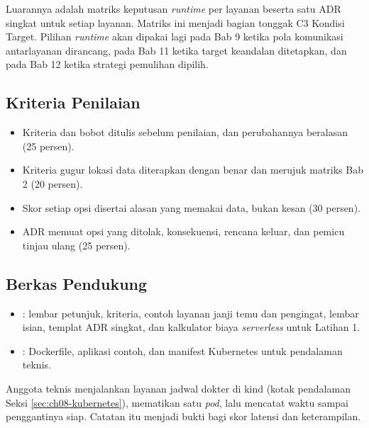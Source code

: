 Luarannya adalah matriks keputusan \textit{runtime} per layanan beserta satu ADR singkat untuk
setiap layanan. Matriks ini menjadi bagian tonggak C3 Kondisi Target. Pilihan \textit{runtime}
akan dipakai lagi pada Bab 9 ketika pola komunikasi antarlayanan dirancang, pada Bab 11 ketika
target keandalan ditetapkan, dan pada Bab 12 ketika strategi pemulihan dipilih.

\subsection*{Kriteria Penilaian}

\begin{itemize}
  \item Kriteria dan bobot ditulis sebelum penilaian, dan perubahannya beralasan (25 persen).
  \item Kriteria gugur lokasi data diterapkan dengan benar dan merujuk matriks Bab 2 (20 persen).
  \item Skor setiap opsi disertai alasan yang memakai data, bukan kesan (30 persen).
  \item ADR memuat opsi yang ditolak, konsekuensi, rencana keluar, dan pemicu tinjau ulang (25
        persen).
\end{itemize}

\subsection*{Berkas Pendukung}

\begin{itemize}
  \item {}: lembar petunjuk, kriteria,
        contoh layanan janji temu dan pengingat, lembar isian, templat ADR singkat, dan kalkulator
        biaya \textit{serverless} untuk Latihan 1.
  \item {}: Dockerfile, aplikasi contoh, dan manifest
        Kubernetes untuk pendalaman teknis.
\end{itemize}

\begin{pendalaman}[title={Pendalaman Teknis (opsional): Menguji Asumsi Matriks}]
  Anggota teknis menjalankan layanan jadwal dokter di kind (kotak pendalaman Seksi
  \ref{sec:ch08-kubernetes}), mematikan satu \textit{pod}, lalu mencatat waktu sampai
  penggantinya siap. Catatan itu menjadi bukti bagi skor latensi dan keterampilan.
\end{pendalaman}

